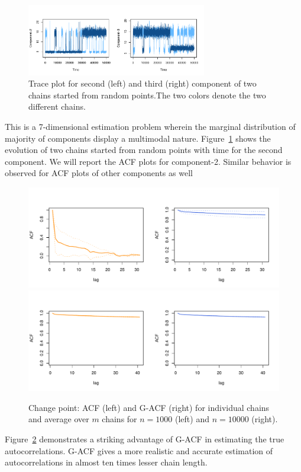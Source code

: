 \documentclass[11pt]{article}
\theoremstyle{remark}
\begin{document}
\begin{figure}[h]
    \centering
    \includegraphics[width = 0.7\textwidth]{plots/poisson-trace_n50000.pdf}
    \caption{Trace plot for second (left) and third (right) component of two chains started from random points.The two colors denote the two different chains.}
    \label{fig:poisson-trace}
\end{figure}

This is a 7-dimensional estimation problem wherein the marginal distribution of majority of components display a multimodal nature. Figure~\ref{fig:poisson-trace} shows the evolution of two chains started from random points with time for the second component. We will report the ACF plots for component-2. Similar behavior is observed for ACF plots of other components as well

\begin{figure}[h]
    \centering
      \includegraphics[width = .6\textwidth]{plots/poisson-acf_n1000.pdf}    
      \includegraphics[width = .6\textwidth]{plots/poisson-acf_n10000.pdf}      
    \caption{Change point: ACF (left) and G-ACF (right) for individual chains and average over $m$ chains for $n = 1000$ (left) and $n = 10000$ (right).}
    \label{fig:poisson-acf}
\end{figure}

Figure~\ref{fig:poisson-acf} demonstrates a striking advantage of G-ACF in estimating the true autocorrelations. G-ACF gives a more realistic and accurate estimation of autocorrelations in almost ten times lesser chain length.
\end{document}
